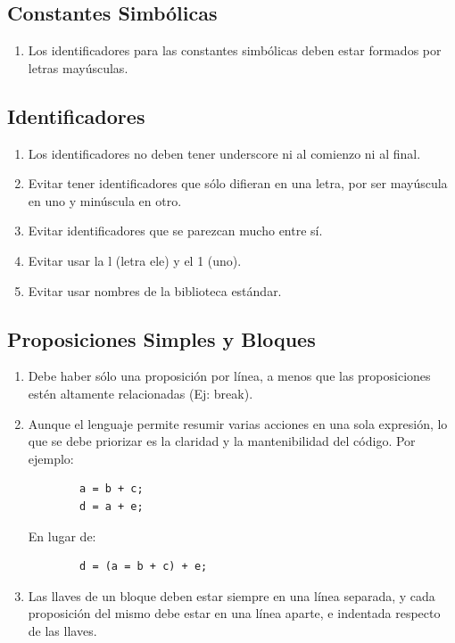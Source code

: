 \documentclass{article}
\begin{document}
\subsection{Constantes Simbólicas}
\begin{enumerate}
    \item Los identificadores para las constantes simbólicas deben estar formados por letras mayúsculas.
\end{enumerate}

\subsection{Identificadores}
\begin{enumerate}
    \item Los identificadores no deben tener underscore ni al comienzo ni al final.
    \item Evitar tener identificadores que sólo difieran en una letra, por ser mayúscula en uno y minúscula en otro.
    \item Evitar identificadores que se parezcan mucho entre sí.
    \item Evitar usar la l (letra ele) y el 1 (uno).
    \item Evitar usar nombres de la biblioteca estándar.
\end{enumerate}

\subsection{Proposiciones Simples y Bloques}
\begin{enumerate}
    \item Debe haber sólo una proposición por línea, a menos que las proposiciones estén altamente relacionadas (Ej: break).
    \item Aunque el lenguaje permite resumir varias acciones en una sola expresión, lo que se debe priorizar es la claridad y la mantenibilidad del código.
    Por ejemplo:
    \begin{lstlisting}
        a = b + c;
        d = a + e;
    \end{lstlisting}
    En lugar de:
    \begin{lstlisting}
        d = (a = b + c) + e;
    \end{lstlisting}
    \item Las llaves de un bloque deben estar siempre en una línea separada, y cada proposición del mismo debe estar en una línea aparte, e indentada respecto de las llaves.
\end{enumerate}
\end{document}
